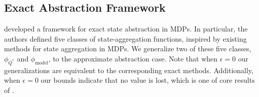 \subsection{Exact Abstraction Framework}

\citep*{li2006towards} developed a framework for exact state abstraction in \acp{MDP}. In particular, the authors defined five classes of state-aggregation functions, inspired by existing methods for state aggregation in \acp{MDP}. We generalize two of these five classes, $\phi_{Q^*}$ and $\phi_{\text{model}}$, to the approximate abstraction case. Note that when $\epsilon=0$ our generalizations are equivalent to the corresponding exact methods. Additionally, when $\epsilon=0$ our bounds indicate that no value is lost, which is one of core results of \citep{li2006towards}.

